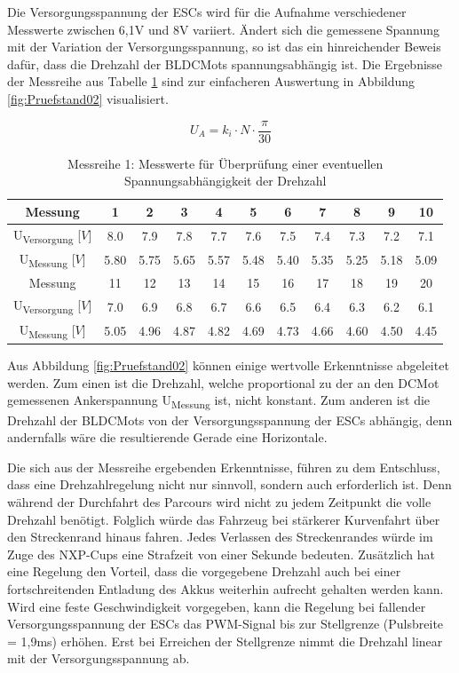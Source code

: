 Die Versorgungsspannung der \acp{ESC} wird für die Aufnahme verschiedener Messwerte zwischen 6,1V und 8V variiert. Ändert sich die gemessene Spannung mit der Variation der Versorgungsspannung, so ist das ein hinreichender Beweis dafür, dass die Drehzahl der \acp{BLDCMot} spannungsabhängig ist. Die Ergebnisse der Messreihe aus Tabelle \ref{tab:PruefstandMess01} sind zur einfacheren Auswertung in Abbildung \ref{fig:Pruefstand02} visualisiert.

\begin{equation}\label{eq1}
U_A = k_i \cdot N \cdot \frac{\pi}{30}
\end{equation}

\begin{table}[H]
\begin{tabular}{|c|c|c|c|c|c|c|c|c|c|c|}
\hline
\rule{0pt}{15pt} Messung & 1&2&3&4&5&6&7&8&9&10 \\
\hline
U\textsubscript{Versorgung} [$V$]&8.0&7.9&7.8&7.7&7.6&7.5&7.4&7.3&7.2&7.1 \\ 
\hline
U\textsubscript{Messung} [$V$]&5.80&5.75&5.65&5.57&5.48&5.40&5.35&5.25&5.18&5.09 \\
\hline
\hline
\rule{0pt}{15pt} Messung & 11&12&13&14&15&16&17&18&19&20 \\
\hline
U\textsubscript{Versorgung} [$V$]&7.0&6.9&6.8&6.7&6.6&6.5&6.4&6.3&6.2&6.1 \\ 
\hline
U\textsubscript{Messung} [$V$]&5.05&4.96&4.87&4.82&4.69&4.73&4.66&4.60&4.50&4.45 \\
\hline
\end{tabular}
\centering
\captionsetup{width=.95\textwidth}
\caption[Messreihe 1: Spannungsabhängigkeit Drehzahl]{Messreihe 1: Messwerte für Überprüfung einer eventuellen Spannungsabhängigkeit der Drehzahl}\centering
\label{tab:PruefstandMess01}
\end{table}

Aus Abbildung \ref{fig:Pruefstand02} können einige wertvolle Erkenntnisse abgeleitet werden. Zum einen ist die Drehzahl, welche proportional zu der an den \ac{DCMot} gemessenen Ankerspannung U\textsubscript{Messung} ist, nicht konstant. Zum anderen ist die Drehzahl der \acp{BLDCMot} von der Versorgungsspannung der \acp{ESC} abhängig, denn andernfalls wäre die resultierende Gerade eine Horizontale.\vspace{11pt}

Die sich aus der Messreihe ergebenden Erkenntnisse, führen zu dem Entschluss, dass eine Drehzahlregelung nicht nur sinnvoll, sondern auch erforderlich ist. Denn während der Durchfahrt des Parcours wird nicht zu jedem Zeitpunkt die volle Drehzahl benötigt. Folglich würde das Fahrzeug bei stärkerer Kurvenfahrt über den Streckenrand hinaus fahren. Jedes Verlassen des Streckenrandes würde im Zuge des NXP-Cups eine Strafzeit von einer Sekunde bedeuten. Zusätzlich hat eine Regelung den Vorteil, dass die vorgegebene Drehzahl auch bei einer fortschreitenden Entladung des Akkus weiterhin aufrecht gehalten werden kann. Wird eine feste Geschwindigkeit vorgegeben, kann die Regelung bei fallender Versorgungsspannung der \acp{ESC} das \ac{PWM}-Signal bis zur Stellgrenze (Pulsbreite = 1,9ms) erhöhen. Erst bei Erreichen der Stellgrenze nimmt die Drehzahl linear mit der Versorgungsspannung ab.


